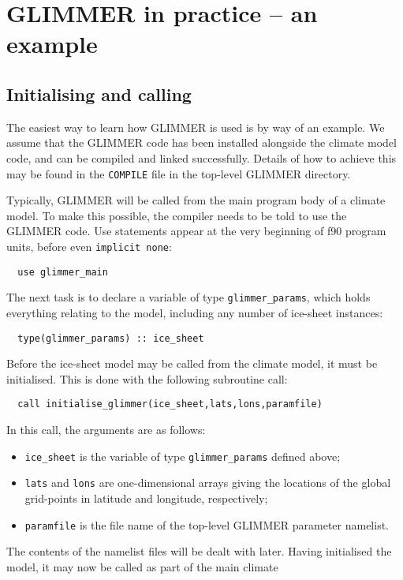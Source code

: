 \section{GLIMMER in practice -- an example}

\subsection{Initialising and calling}

The easiest way to learn how GLIMMER is used is by way of an
example. We assume that the GLIMMER code has been installed alongside the
climate model code, and can be compiled and linked successfully. Details of
how to achieve this may be found in the \texttt{COMPILE} file in the top-level
GLIMMER directory. 

Typically, GLIMMER will be called from the main program body of a
climate model. To make this possible, the compiler needs to be told to use the
GLIMMER code. Use statements appear at the very beginning of f90 program
units, before even \texttt{implicit none}:
%
\begin{verbatim}
  use glimmer_main
\end{verbatim}
%
The next task is to declare a variable of type \texttt{glimmer\_params}, which
holds everything relating to the model, including any number of ice-sheet
instances:
%
\begin{verbatim}
  type(glimmer_params) :: ice_sheet
\end{verbatim}
%
Before the ice-sheet model may be called from the climate model, it must be
initialised. This is done with the following subroutine call:
%
\begin{verbatim}
  call initialise_glimmer(ice_sheet,lats,lons,paramfile)
\end{verbatim}
%
In this call, the arguments are as follows:
%
\begin{itemize}
\item \texttt{ice\_sheet} is the variable of type \texttt{glimmer\_params}
 defined above;
\item \texttt{lats} and \texttt{lons} are one-dimensional arrays giving the
  locations of the global grid-points in latitude and longitude, respectively; 
\item \texttt{paramfile} is the file name of the top-level GLIMMER parameter
  namelist.
\end{itemize}
%
The contents of the namelist files will be dealt with later. Having
initialised the model, it may now be called as part of the main climate
